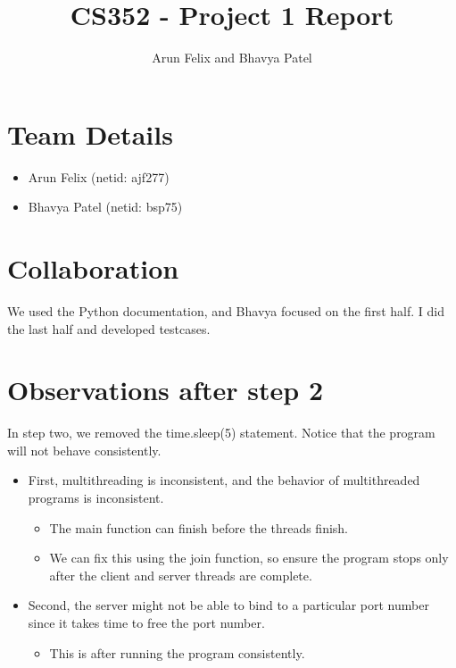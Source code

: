 \documentclass{article}
\begin{document}
\title{CS352 - Project 1 Report}
\author{Arun Felix and Bhavya Patel}
\maketitle

\section{Team Details}

\begin{center}
    \begin{itemize}
        \item Arun Felix (netid: ajf277)
        \item Bhavya Patel (netid: bsp75)
    \end{itemize}    
\end{center}

\section{Collaboration}

We used the Python documentation, and Bhavya focused on the first half. I did the last half and developed testcases.

\section{Observations after step 2}

In step two, we removed the time.sleep(5) statement. Notice that the program will not behave consistently. 

\begin{itemize}
    \item First, multithreading is inconsistent, and the behavior of multithreaded programs is inconsistent.
    \begin{itemize}
        \item The main function can finish before the threads finish.
        \item We can fix this using the join function, so ensure the program stops only after the client and server threads are complete.
    \end{itemize}
    \item Second, the server might not be able to bind to a particular port number since it takes time to free the port number.
    \begin{itemize}
        \item This is after running the program consistently.
    \end{itemize}
\end{itemize}
\end{document}
